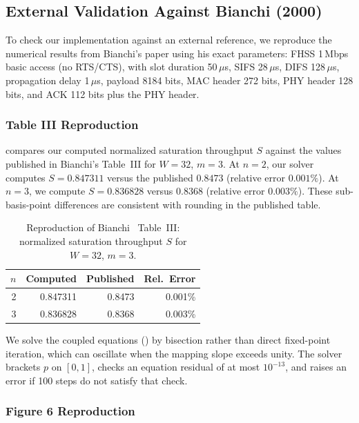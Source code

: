 \documentclass[conference]{IEEEtran}
\begin{document}
\subsection{External Validation Against Bianchi (2000)}
\label{sec:external_val}

To check our implementation against an external reference, we
reproduce the numerical results from Bianchi's paper
\cite{bianchi2000} using his exact parameters: FHSS 1\,Mbps basic
access (no RTS/CTS), with slot duration 50\,$\mu$s, SIFS 28\,$\mu$s,
DIFS 128\,$\mu$s, propagation delay 1\,$\mu$s, payload 8184 bits,
MAC header 272 bits, PHY header 128 bits, and ACK 112 bits plus the PHY header.

\subsubsection{Table III Reproduction}

 compares our computed normalized saturation
throughput $S$ against the values published in Bianchi's Table~III for
$W{=}32$, $m{=}3$.  At $n{=}2$, our solver computes $S = 0.847311$
versus the published $0.8473$ (relative error $0.001\%$).  At $n{=}3$,
we compute $S = 0.836828$ versus $0.8368$ (relative error $0.003\%$).
These sub-basis-point differences are consistent with rounding in the
published table.

\begin{table}[t]
\centering
\caption{Reproduction of Bianchi~\cite{bianchi2000} Table~III:
normalized saturation throughput $S$ for $W{=}32$, $m{=}3$.}
\label{tab:bianchi_table3}
\begin{tabular}{@{}rrrr@{}}
\toprule
$n$ & \textbf{Computed} & \textbf{Published} & \textbf{Rel.\ Error} \\
\midrule
2  & 0.847311 & 0.8473 & 0.001\% \\
3  & 0.836828 & 0.8368 & 0.003\% \\
\bottomrule
\end{tabular}
\end{table}

We solve the coupled equations () by bisection rather
than direct fixed-point iteration, which can oscillate when the mapping slope
exceeds unity. The solver brackets $p$ on $[0,1]$, checks an equation
residual of at most $10^{-13}$, and raises an error if 100 steps do not
satisfy that check.

\subsubsection{Figure 6 Reproduction}
\end{document}
